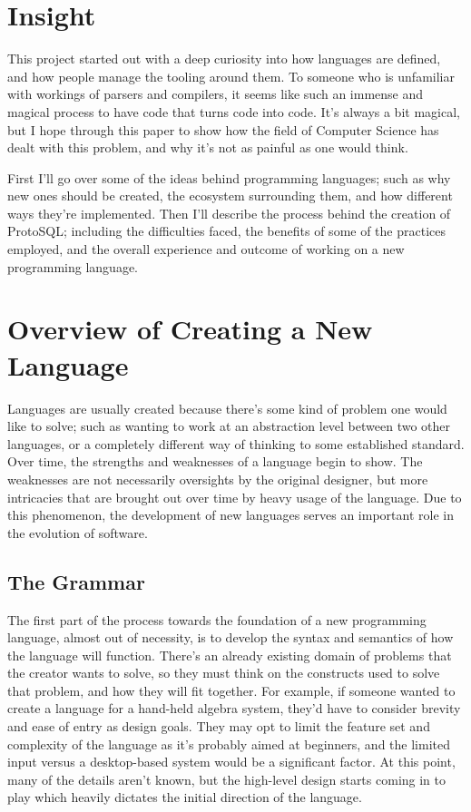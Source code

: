 \documentclass[titlepage]{article}
\begin{document}
	\section{Insight}

		This project started out with a deep curiosity into how languages are defined, and how people manage the tooling around them.  To someone who is unfamiliar with workings of parsers and compilers, it seems like such an immense and magical process to have code that turns code into code.  It's always a bit magical, but I hope through this paper to show how the field of Computer Science has dealt with this problem, and why it's not as painful as one would think.

		First I'll go over some of the ideas behind programming languages; such as why new ones should be created, the ecosystem surrounding them, and how different ways they're implemented.  Then I'll describe the process behind the creation of ProtoSQL; including the difficulties faced, the benefits of some of the practices employed, and the overall experience and outcome of working on a new programming language.

	\section{Overview of Creating a New Language}

		Languages are usually created because there's some kind of problem one would like to solve; such as wanting to work at an abstraction level between two other languages, or a completely different way of thinking to some established standard.  Over time, the strengths and weaknesses of a language begin to show.  The weaknesses are not necessarily oversights by the original designer, but more intricacies that are brought out over time by heavy usage of the language.  Due to this phenomenon, the development of new languages serves an important role in the evolution of software.

		\subsection{The Grammar}

			The first part of the process towards the foundation of a new programming language, almost out of necessity, is to develop the syntax and semantics of how the language will function.  There's an already existing domain of problems that the creator wants to solve, so they must think on the constructs used to solve that problem, and how they will fit together.  For example, if someone wanted to create a language for a hand-held algebra system, they'd have to consider brevity and ease of entry as design goals.  They may opt to limit the feature set and complexity of the language as it's probably aimed at beginners, and the limited input versus a desktop-based system would be a significant factor.  At this point, many of the details aren't known, but the high-level design starts coming in to play which heavily dictates the initial direction of the language.
\end{document}
